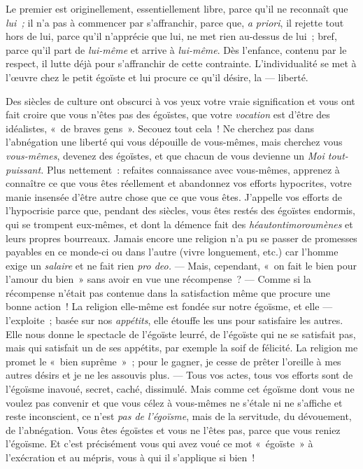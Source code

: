 \documentclass[french,twoside]{book} %
\begin{document}
Le premier est originellement, essentiellement libre, parce qu’il ne reconnaît que \emph{lui ;} il n’a pas à commencer par s’affranchir, parce que, \emph{a priori}, il rejette tout hors de lui, parce qu’il n’apprécie que lui, ne met rien au-dessus de lui ; bref, parce qu’il part de \emph{lui-même} et arrive à \emph{lui-même}. Dès l’enfance, contenu par le respect, il lutte déjà pour s’affranchir de cette contrainte. L’individualité se met à l’œuvre chez le petit égoïste et lui procure ce qu’il désire, la — liberté.\par
Des siècles de culture ont obscurci à vos yeux votre vraie signification et vous ont fait croire que vous n’êtes pas des égoïstes, que votre \emph{vocation} est d’être des idéalistes, « de braves gens ». Secouez tout cela ! Ne cherchez pas dans l’abnégation une liberté qui vous dépouille de vous-mêmes, mais cherchez vous \emph{vous-mêmes}, devenez des égoïstes, et que chacun de vous devienne un \emph{Moi tout-puissant.} Plus nettement : refaites connaissance avec vous-mêmes, apprenez à connaître ce que vous êtes réellement et abandonnez vos efforts hypocrites, votre manie insensée d’être autre chose que ce que vous êtes. J’appelle vos efforts  de l’hypocrisie parce que, pendant des siècles, vous êtes restés des égoïstes endormis, qui se trompent eux-mêmes, et dont la démence fait des \emph{héautontimoroumènes} et leurs propres bourreaux. Jamais encore une religion n’a pu se passer de promesses payables en ce monde-ci ou dans l’autre (vivre longuement, etc.) car l’homme exige un \emph{salaire} et ne fait rien \emph{pro deo. } — Mais, cependant, « on fait le bien pour l’amour du bien » sans avoir en vue une récompense ? — Comme si la récompense n’était pas contenue dans la satisfaction même que procure une bonne action ! La religion elle-même est fondée sur notre égoïsme, et elle — l’exploite ; basée sur nos \emph{appétits}, elle étouffe les uns pour satisfaire les autres. Elle nous donne le spectacle de l’égoïste leurré, de l’égoïste qui ne se satisfait pas, mais qui satisfait un de ses appétits, par exemple la soif de félicité. La religion me promet le « bien suprême » ; pour le gagner, je cesse de prêter l’oreille à mes autres désirs et je ne les assouvis plus. — Tous vos actes, tous vos efforts sont de l’égoïsme inavoué, secret, caché, dissimulé. Mais comme cet égoïsme dont vous ne voulez pas convenir et que vous célez à vous-mêmes ne s’étale ni ne s’affiche et reste inconscient, ce n’est \emph{pas de l’égoïsme}, mais de la servitude, du dévouement, de l’abnégation. Vous êtes égoïstes et vous ne l’êtes pas, parce que vous reniez l’égoïsme. Et c’est précisément vous qui avez voué ce mot « égoïste » à l’exécration et au mépris, vous à qui il s’applique si bien !\par
\end{document}
